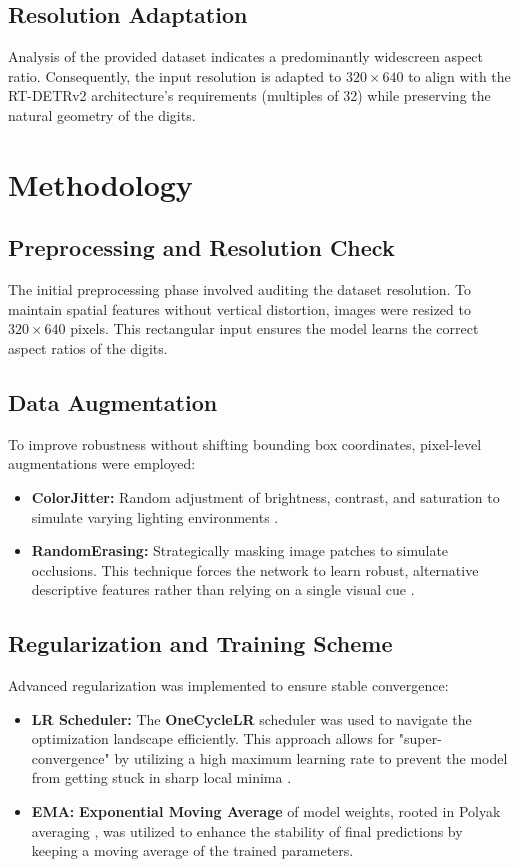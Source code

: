 \documentclass[12pt, a4paper]{article}
\begin{document}
\subsection{Resolution Adaptation}
Analysis of the provided dataset indicates a predominantly widescreen aspect ratio. Consequently, the input resolution is adapted to \textbf{$320 \times 640$} to align with the RT-DETRv2 architecture's requirements (multiples of 32) while preserving the natural geometry of the digits.

\section{Methodology}

\subsection{Preprocessing and Resolution Check}
The initial preprocessing phase involved auditing the dataset resolution. To maintain spatial features without vertical distortion, images were resized to $320 \times 640$ pixels. This rectangular input ensures the model learns the correct aspect ratios of the digits.

\subsection{Data Augmentation}
To improve robustness without shifting bounding box coordinates, pixel-level augmentations were employed:
\begin{itemize}
    \item \textbf{ColorJitter:} Random adjustment of brightness, contrast, and saturation to simulate varying lighting environments \cite{carion2020}.
    \item \textbf{RandomErasing:} Strategically masking image patches to simulate occlusions. This technique forces the network to learn robust, alternative descriptive features rather than relying on a single visual cue \cite{zhong2020}.
\end{itemize}

\subsection{Regularization and Training Scheme}
Advanced regularization was implemented to ensure stable convergence:
\begin{itemize}
    \item \textbf{LR Scheduler:} The \textbf{OneCycleLR} scheduler was used to navigate the optimization landscape efficiently. This approach allows for "super-convergence" by utilizing a high maximum learning rate to prevent the model from getting stuck in sharp local minima \cite{smith2019}.
    \item \textbf{EMA:} \textbf{Exponential Moving Average} of model weights, rooted in Polyak averaging \cite{polyak1992}, was utilized to enhance the stability of final predictions by keeping a moving average of the trained parameters.
\end{itemize}
\end{document}
